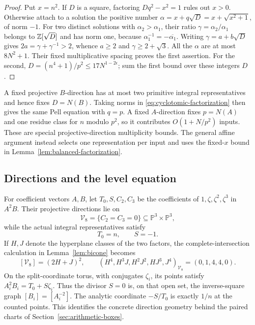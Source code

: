 \begin{proof}
Put $x=n^2$. If $D$ is a square, factoring
$Dq^2-x^2=1$ rules out $x>0$. Otherwise attach to a solution the
positive number $\alpha=x+q\sqrt D=x+\sqrt{x^2+1}$, of norm $-1$.
For two distinct solutions with $\alpha_2>\alpha_1$, their ratio
$\gamma=\alpha_2/\alpha_1$ belongs to $\mathbb Z[\sqrt D]$ and has norm
one, because $\alpha_1^{-1}=-\overline{\alpha_1}$. Writing
$\gamma=a+b\sqrt D$ gives
$2a=\gamma+\gamma^{-1}>2$, whence $a\ge2$ and
$\gamma\ge2+\sqrt3$. All the $\alpha$ are at most $8N^2+1$.
Their fixed multiplicative spacing proves the first assertion.
For the second, $D=(n^4+1)/p^2\le17N^{1-2\epsilon}$; sum the first
bound over these integers $D$.
\end{proof}

A fixed projective $B$-direction has at most two primitive integral
representatives and hence fixes $D=N(B)$. Taking norms in
\eqref{eq:cyclotomic-factorization} then gives the same Pell equation
with $q=p$. A fixed $A$-direction fixes $p=N(A)$ and one residue
class for $n$ modulo $p^2$, so it contributes
$O(1+N/p^2)$ inputs. These are special projective-direction
multiplicity bounds. The general affine argument instead selects one
representation per input and uses the fixed-$x$ bound in
Lemma~\ref{lem:balanced-factorization}.

\subsection{Directions and the level equation}

For coefficient vectors $A,B$, let $T_0,S,C_2,C_3$ be the coefficients
of $1,\zeta,\zeta^2,\zeta^3$ in $A^2B$. Their projective directions
lie on
\[
 \mathcal V_8=\{C_2=C_3=0\}\subseteq\mathbb P^3\times\mathbb P^3,
\]
while the actual integral representatives satisfy
\begin{equation}\label{eq:cyclotomic-level}
 T_0=n,\qquad S=-1.
\end{equation}
If $H,J$ denote the hyperplane classes of the two factors, the
complete-intersection calculation in Lemma~\ref{lem:bicone} becomes
\[
 [\mathcal V_8]=(2H+J)^2,\qquad
 (H^4,H^3J,H^2J^2,HJ^3,J^4)_{\mathcal V_8}=(0,1,4,4,0).
\]
On the split-coordinate torus, with conjugates $\zeta_i$, its points
satisfy $A_i^2B_i=T_0+S\zeta_i$. Thus the divisor $S=0$ is, on that
open set, the inverse-square graph $[B_i]=[A_i^{-2}]$.
The analytic coordinate $-S/T_0$ is exactly $1/n$ at the counted
points. This identifies the concrete direction geometry behind the
paired charts of Section~\ref{sec:arithmetic-boxes}.

